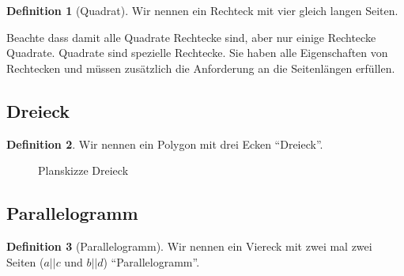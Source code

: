 \documentclass[a4paper]{book}%
\theoremstyle{definition}
\newtheorem{definition}{Definition}
\begin{document}
\begin{definition}[Quadrat]
    Wir nennen ein Rechteck mit vier gleich langen Seiten.
\end{definition}

Beachte dass damit alle Quadrate Rechtecke sind, aber nur einige Rechtecke Quadrate. Quadrate sind spezielle Rechtecke. Sie haben alle Eigenschaften von Rechtecken und müssen zusätzlich die Anforderung an die Seitenlängen erfüllen.


\subsection{Dreieck}\label{Dreieck}

\begin{definition}
    Wir nennen ein Polygon mit drei Ecken \enquote{Dreieck}.
\end{definition}

\begin{figure}
  \centering
  \caption{Planskizze Dreieck}\label{fig:DreieckPlanskizze}
\end{figure}


\subsection{Parallelogramm}\label{Parallelogramm}

\begin{definition}[Parallelogramm]
    Wir nennen ein Viereck mit zwei mal zwei  Seiten ($a || c$ und $b || d$) \enquote{Parallelogramm}.
\end{definition}
\end{document}
